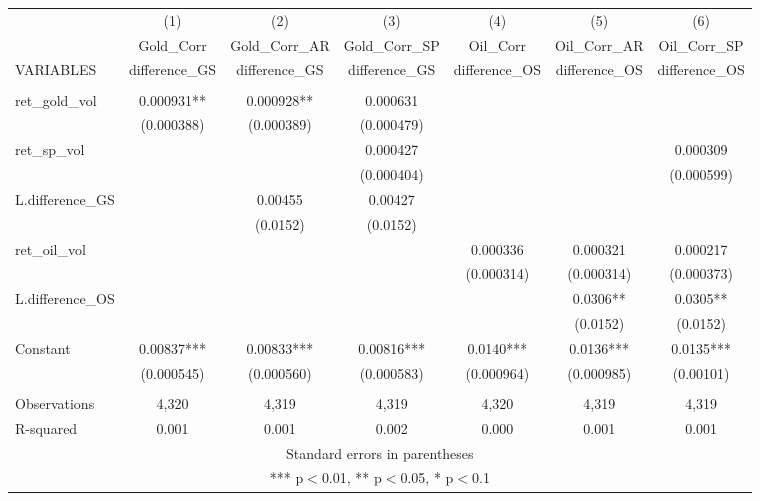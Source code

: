 \documentclass[]{article}
\begin{document}
\begin{tabular}{lcccccc} \hline
 & (1) & (2) & (3) & (4) & (5) & (6) \\
 & Gold\_Corr & Gold\_Corr\_AR & Gold\_Corr\_SP & Oil\_Corr & Oil\_Corr\_AR & Oil\_Corr\_SP \\
VARIABLES & difference\_GS & difference\_GS & difference\_GS & difference\_OS & difference\_OS & difference\_OS \\ \hline
 &  &  &  &  &  &  \\
ret\_gold\_vol & 0.000931** & 0.000928** & 0.000631 &  &  &  \\
 & (0.000388) & (0.000389) & (0.000479) &  &  &  \\
ret\_sp\_vol &  &  & 0.000427 &  &  & 0.000309 \\
 &  &  & (0.000404) &  &  & (0.000599) \\
L.difference\_GS &  & 0.00455 & 0.00427 &  &  &  \\
 &  & (0.0152) & (0.0152) &  &  &  \\
ret\_oil\_vol &  &  &  & 0.000336 & 0.000321 & 0.000217 \\
 &  &  &  & (0.000314) & (0.000314) & (0.000373) \\
L.difference\_OS &  &  &  &  & 0.0306** & 0.0305** \\
 &  &  &  &  & (0.0152) & (0.0152) \\
Constant & 0.00837*** & 0.00833*** & 0.00816*** & 0.0140*** & 0.0136*** & 0.0135*** \\
 & (0.000545) & (0.000560) & (0.000583) & (0.000964) & (0.000985) & (0.00101) \\
 &  &  &  &  &  &  \\
Observations & 4,320 & 4,319 & 4,319 & 4,320 & 4,319 & 4,319 \\
 R-squared & 0.001 & 0.001 & 0.002 & 0.000 & 0.001 & 0.001 \\ \hline
\multicolumn{7}{c}{ Standard errors in parentheses} \\
\multicolumn{7}{c}{ *** p$<$0.01, ** p$<$0.05, * p$<$0.1} \\
\end{tabular}
\end{document}
